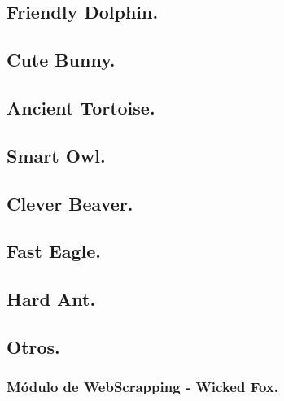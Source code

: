       \subsection{Friendly Dolphin.}
      \subsection{Cute Bunny.}
      \subsection{Ancient Tortoise.}
      \subsection{Smart Owl.}
      \subsection{Clever Beaver.}
      \subsection{Fast Eagle.}
      \subsection{Hard Ant.}
      \subsection{Otros.}
      \subsubsection{Módulo de WebScrapping - Wicked Fox.}
      